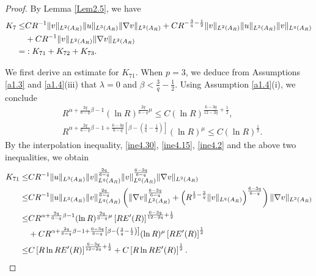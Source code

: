 \documentclass[11pt,reqno]{amsart}
\numberwithin{Thm}{section}
\begin{document}
\begin{proof}
By Lemma \ref{Lem2.5}, we have
\begin{align}\label{ine4.36}
		K_7 \leq& C R^{-1} \|v\|_{L^2(A_R)}\|u\|_{L^3(A_R)}\|\nabla v\|_{L^2(A_R)}+CR^{-\frac{3}{q}-\frac{1}{2}}\|v\|_{L^2(A_R)}\|u\|_{L^3(A_R)}\|v\|_{L^q(A_R)}\notag\\
        &+C R^{-1} \|v\|_{L^2(A_R)}\|\nabla v\|_{L^2(A_R)}\\
		=&:K_{71} + K_{72} + K_{73}.\notag
\end{align}


We first derive an estimate for $K_{71}$. When $p=3$, we deduce from  Assumptions \ref{a1.3} and \ref{a1.4}(iii) that $\lambda=0$ and $\beta<\frac{3}{q}-\frac{1}{2}$. Using Assumption \ref{a1.4}(i), we conclude
\begin{align*}
&R^{\alpha+\frac{2q}{6-q}\beta-1}(\ln R)^{\frac{2q}{6-q}\mu}\leq C(\ln R)^{\frac{6-3q}{12-2q}+\frac{1}{2}},\\
&R^{\alpha+\frac{2q}{6-q}\beta-1+\frac{6-3q}{6-q}\left[\beta-\left(\frac{3}{q}-\frac{1}{2}\right)\right]}(\ln R)^{\mu}\leq C(\ln R)^\frac{1}{2}.
\end{align*}
By the interpolation inequality, \eqref{ine4.30}, \eqref{ine4.15}, \eqref{ine4.2} and the above two inequalities, we obtain
\begin{align}\label{ine4.36a}
		K_{71} \leq& C R^{-1}\|u\|_{L^3(A_R)}\|v\|_{L^q(A_R)}^{\frac{2q}{6-q}}\|v\|_{L^6(A_R)}^{\frac{6-3q}{6-q}}\|\nabla v\|_{L^2(A_R)}\notag\\
               \leq& C R^{-1}\|u\|_{L^3(A_R)}\|v\|_{L^q(A_R)}^{\frac{2q}{6-q}}\left(\|\nabla v\|_{L^2(A_R)}^{\frac{6-3q}{6-q}}+\left(R^{\frac{1}{2}-\frac{3}{q}} \|v\|_{L^q(A_R)}\right)^{\frac{6-3q}{6-q}}\right)\|\nabla v\|_{L^2(A_R)}\notag\\
               \leq&C R^{\alpha+\frac{2q}{6-q}\beta-1}(\ln R)^{\frac{2q}{6-q}\mu}\left[R E'(R)\right]^{\frac{6-3q}{12-2q}+\frac{1}{2}}\\
               &+C R^{\alpha+\frac{2q}{6-q}\beta-1+\frac{6-3q}{6-q}\left[\beta-\left(\frac{3}{q}-\frac{1}{2}\right)\right]}(\ln R)^{\mu}\left[R E'(R)\right]^{\frac{1}{2}}\notag\\
               \leq&C\left[R\ln RE'(R)\right]^{\frac{6-3q}{12-2q}+\frac{1}{2}}+C\left[R\ln R E'(R)\right]^{\frac{1}{2}}.\notag
\end{align}



\end{proof}
\end{document}
